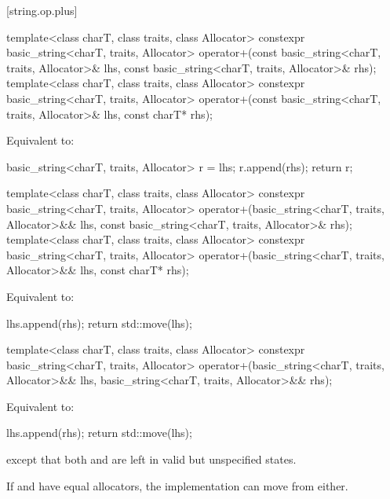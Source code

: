 
[string.op.plus]{}

%
\begin{itemdecl}
template<class charT, class traits, class Allocator>
  constexpr basic_string<charT, traits, Allocator>
    operator+(const basic_string<charT, traits, Allocator>& lhs,
              const basic_string<charT, traits, Allocator>& rhs);
template<class charT, class traits, class Allocator>
  constexpr basic_string<charT, traits, Allocator>
    operator+(const basic_string<charT, traits, Allocator>& lhs, const charT* rhs);
\end{itemdecl}

\begin{itemdescr}
\pnum
\effects
Equivalent to:
\begin{codeblock}
basic_string<charT, traits, Allocator> r = lhs;
r.append(rhs);
return r;
\end{codeblock}
\end{itemdescr}

%
\begin{itemdecl}
template<class charT, class traits, class Allocator>
  constexpr basic_string<charT, traits, Allocator>
    operator+(basic_string<charT, traits, Allocator>&& lhs,
              const basic_string<charT, traits, Allocator>& rhs);
template<class charT, class traits, class Allocator>
  constexpr basic_string<charT, traits, Allocator>
    operator+(basic_string<charT, traits, Allocator>&& lhs, const charT* rhs);
\end{itemdecl}

\begin{itemdescr}
\pnum
\effects
Equivalent to:
\begin{codeblock}
lhs.append(rhs);
return std::move(lhs);
\end{codeblock}
\end{itemdescr}

%
\begin{itemdecl}
template<class charT, class traits, class Allocator>
  constexpr basic_string<charT, traits, Allocator>
    operator+(basic_string<charT, traits, Allocator>&& lhs,
              basic_string<charT, traits, Allocator>&& rhs);
\end{itemdecl}

\begin{itemdescr}
\pnum
\effects
Equivalent to:
\begin{codeblock}
lhs.append(rhs);
return std::move(lhs);
\end{codeblock}
except that both  and 
are left in valid but unspecified states.
\begin{note}
If  and  have equal allocators,
the implementation can move from either.
\end{note}
\end{itemdescr}

